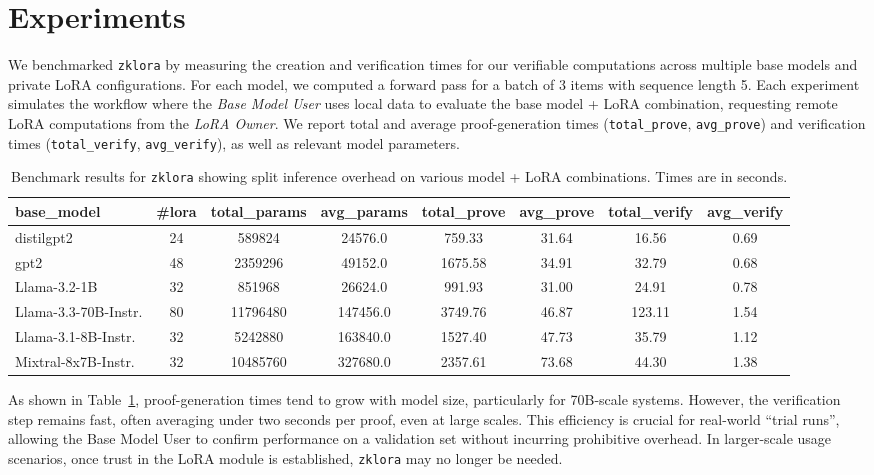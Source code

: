 \documentclass[11pt]{article}
\begin{document}
\section{Experiments}
We benchmarked \texttt{zklora} by measuring the creation and verification times for our verifiable computations across multiple base models and private LoRA configurations. For each model, we computed a forward pass for a batch of 3 items with sequence length 5. 
Each experiment simulates the workflow where the \emph{Base Model User} uses local data to evaluate the base model + LoRA combination, requesting remote LoRA computations from the \emph{LoRA Owner}. 
We report total and average proof-generation times (\texttt{total\_prove}, \texttt{avg\_prove}) and verification times (\texttt{total\_verify}, \texttt{avg\_verify}), as well as relevant model parameters.

\begin{table}[ht]
    \centering
    \small
    \begin{tabular}{l c c c c c c c}
    \toprule
    \textbf{base\_model} & \textbf{\#lora} & \textbf{total\_params} & \textbf{avg\_params} & \textbf{total\_prove} & \textbf{avg\_prove} & \textbf{total\_verify} & \textbf{avg\_verify} \\
    \midrule
distilgpt2 & 24 & 589824 & 24576.0 & 759.33 & 31.64 & 16.56 & 0.69 \\
gpt2 & 48 & 2359296 & 49152.0 & 1675.58 & 34.91 & 32.79 & 0.68 \\
Llama-3.2-1B & 32 & 851968 & 26624.0 & 991.93 & 31.00 & 24.91 & 0.78 \\
Llama-3.3-70B-Instr. & 80 & 11796480 & 147456.0 & 3749.76 & 46.87 & 123.11 & 1.54 \\
Llama-3.1-8B-Instr. & 32 & 5242880 & 163840.0 & 1527.40 & 47.73 & 35.79 & 1.12 \\
Mixtral-8x7B-Instr. & 32 & 10485760 & 327680.0 & 2357.61 & 73.68 & 44.30 & 1.38 \\
    \bottomrule
    \end{tabular}
    \caption{Benchmark results for \texttt{zklora} showing split inference overhead on various model + LoRA combinations. Times are in seconds.}
    \label{tab:results}
\end{table}

As shown in Table~\ref{tab:results}, proof-generation times tend to grow with model size, particularly for 70B-scale systems. However, the verification step remains fast, often averaging under two seconds per proof, even at large scales. This efficiency is crucial for real-world “trial runs”, allowing the Base Model User to confirm performance on a validation set without incurring prohibitive overhead. In larger-scale usage scenarios, once trust in the LoRA module is established, \texttt{zklora} may no longer be needed.
\end{document}
